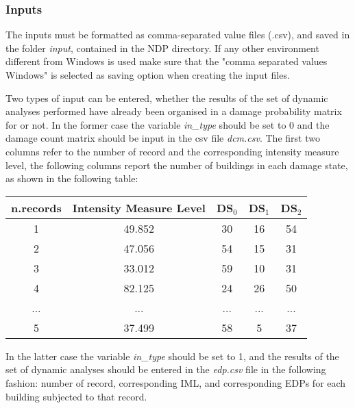 \subsubsection{Inputs}
\label{subsubsec:NDMinputs}
The inputs must be formatted as comma-separated value files (.csv), and saved in the folder \textit{input}, contained in the NDP directory. If any other environment different from Windows is used make sure that the "comma separated values Windows" is selected as saving option when creating the input files.  

Two types of input can be entered, whether the results of the set of dynamic analyses performed have already been organised in a damage probability matrix for or not. In the former case the variable \textit{in\_type} should be set to 0 and the damage count matrix should be input in the csv file \textit{dcm.csv}. The first two columns refer to the number of record and the corresponding intensity measure level, the following columns report the number of buildings in each damage state, as shown in the following table:

\begin{table}[!htbp]
\centering
\begin{tabular}{|c|c|c|c|c|} \hline
\textbf{n.records} & \textbf{Intensity Measure Level} & \textbf{DS$_0$} & \textbf{DS$_1$} & \textbf{DS$_2$} \\ \hline
1 & 49.852 &	30 &	16 &	54\\ \hline
2 & 47.056 &	54 &	15 &	31\\ \hline
3 & 33.012 &	59 &	10 &	31\\ \hline
4 & 82.125 &	24 &	26 &	50\\ \hline
... & ... & ... & ... & ... \\ \hline
5 & 37.499 &	58 &	5 &	37\\ \hline
\end{tabular}
\end{table}

In the latter case the variable \textit{in\_type} should be set to 1, and the results of the set of dynamic analyses should be entered in the \textit{edp.csv} file in the following fashion: number of record, corresponding IML, and corresponding EDPs for each building subjected to that record.

